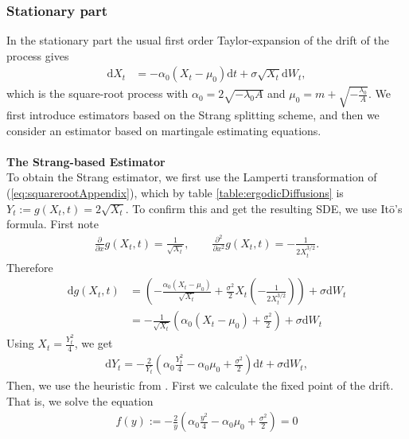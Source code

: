 \subsubsection{Stationary part}\label{subsubsec:squarerootStationary}
In the stationary part the usual first order Taylor-expansion of the drift of the process gives
\begin{align}
    \mathrm{d}X_t &= -\alpha_0\left(X_t - \mu_0\right)\mathrm{d}t + \sigma \sqrt{X_t} \mathrm{d}W_t, \label{eq:squarerootAppendix}
\end{align}
which is the square-root process with $\alpha_0 = 2\sqrt{-\lambda_0A}$ and $\mu_0 = m + \sqrt{-\frac{\lambda_0}{A}}$. 
We first introduce estimators based on the Strang splitting scheme, and then we consider an estimator based on martingale estimating equations.\\\\
\noindent \textbf{The Strang-based Estimator}\\
To obtain the Strang estimator, we first use the Lamperti transformation of (\ref{eq:squarerootAppendix}), which by table \ref{table:ergodicDiffusions} is $Y_t := g(X_t, t) = 2\sqrt{X_t}$. To confirm this and get the resulting SDE, we use Itō's formula. First note
\begin{align}
    \frac{\partial}{\partial x}g(X_t, t) = \frac{1}{\sqrt{X_t}}, \qquad \frac{\partial^2}{\partial x^2}g(X_t, t) = - \frac{1}{2X_t^{3/2}}.
\end{align}
Therefore
\begin{align}
    \mathrm{d}g(X_t, t) &= \left(-\frac{\alpha_0\left(X_t - \mu_0\right)}{\sqrt{X_t}} + \frac{\sigma^2}{2}X_t \left(-\frac{1}{2X_t^{3/2}}\right)\right) + \sigma\mathrm{d}W_t \nonumber \\
    &= -\frac{1}{\sqrt{X_t}}\left(\alpha_0\left(X_t - \mu_0\right) + \frac{\sigma^2}{2}\right) + \sigma\mathrm{d}W_t
\end{align}
Using $X_t = \frac{Y_t^2}{4}$, we get
\begin{align}
    \mathrm{d}Y_t = - \frac{2}{Y_t}\left(\alpha_0 \frac{Y_t^2}{4} - \alpha_0 \mu_0 + \frac{\sigma^2}{2}\right)\mathrm{d}t + \sigma \mathrm{d}W_t, \label{eq:lampertiSquarerootAppendix}
\end{align}
Then, we use the heuristic from \cite[section 2.3 and 2.5]{SplittingSchemes}. First we calculate the fixed point of the drift. That is, we solve the equation
\begin{align}
    f(y) := - \frac{2}{y}\left(\alpha_0 \frac{y^2}{4} - \alpha_0 \mu_0 + \frac{\sigma^2}{2}\right) = 0
\end{align}
